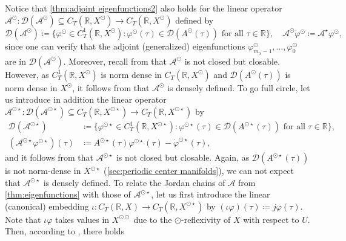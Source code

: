 \documentclass[english]{myarticle}
\begin{document}
\begin{sloppypar}
Notice that \cref{thm:adjoint eigenfunctions2} also holds for the linear operator $\mathcal{A}^\odot : \mathcal{D}(\mathcal{A}^\odot) \subseteq C_T(\mathbb{R},X^{\odot}) \to C_T(\mathbb{R},X^\odot)$ defined by
\begin{equation*}
    \mathcal{D}(\mathcal{A}^{\odot}) \coloneqq \{ \varphi^\odot \in C_T^1(\mathbb{R},X^{\odot}) : \varphi^\odot(\tau) \in \mathcal{D}(A^{\odot}(\tau)) \mbox{ for all $\tau \in \mathbb{R}$} \}, \quad \mathcal{A}^{\odot} \varphi^\odot \coloneqq \mathcal{A}^{\star} \varphi^\odot, 
\end{equation*}
since one can verify \cite[Theorem 13]{Article1} that the adjoint (generalized) eigenfunctions $\varphi_{m_\lambda - 1}^\odot,\dots,\varphi_0^\odot$ are in $\mathcal{D}(\mathcal{A}^\odot)$. Moreover, recall from \cite[Theorem 13]{Article1} that $\mathcal{A}^\odot$ is not closed but closable. However, as $C_T^1(\mathbb{R},X^{\odot})$ is norm dense in $C_T(\mathbb{R},X^{\odot})$ and $\mathcal{D}(A^\odot(\tau))$ is norm dense in $X^\odot$, it follows from \cite[Lemma 17]{Article1} that $\mathcal{A}^\odot$ is densely defined. To go full circle, let us introduce in addition the linear operator $\mathcal{A}^{\odot \star} : \mathcal{D}(\mathcal{A}^{\odot \star}) \subseteq C_T(\mathbb{R},X^{\odot \star}) \to C_T(\mathbb{R},X^{\odot \star})$ by
\begin{align*}
    \mathcal{D}(\mathcal{A}^{\odot \star}) &\coloneqq \{ \varphi^{\odot \star} \in C_T^1(\mathbb{R},X^{\odot \star}) : \varphi^{\odot \star}(\tau) \in \mathcal{D}(A^{\odot \star}(\tau)) \mbox{ for all $\tau \in \mathbb{R}$} \}, \\
    (\mathcal{A}^{\odot \star}\varphi^{\odot \star})(\tau) &\coloneqq A^{\odot \star}(\tau)\varphi^{\odot \star}(\tau) - \dot{\varphi}^{\odot \star}(\tau),
\end{align*}
and it follows from \cite[Proposition 6]{Article2} that $\mathcal{A}^{\odot \star}$ is not closed but closable. Again, as $\mathcal{D}(A^{\odot \star}(\tau))$ is not norm-dense in $X^{\odot \star}$ (\cref{sec:periodic center manifolds}), we can not expect that $\mathcal{A}^{\odot \star}$ is densely defined. To relate the Jordan chains of $\mathcal{A}$ from \cref{thm:eigenfunctions} with those of $\mathcal{A}^{\odot \star}$, let us first introduce the linear (canonical) embedding $\iota : C_T(\mathbb{R},X) \to C_T(\mathbb{R},X^{\odot \star})$ by $(\iota \varphi)(\tau) \coloneqq j \varphi(\tau)$. Note that $\iota \varphi$ takes values in $X^{\odot \odot}$ due to the $\odot$-reflexivity of $X$ with respect to $U$. Then, according to \cite[Theorem 5]{Article1}, there holds

\end{sloppypar}
\end{document}
